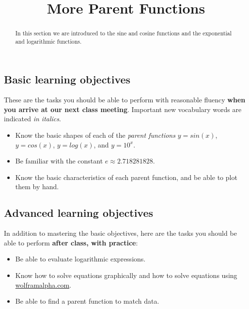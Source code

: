 \documentclass{ximera}
\title{More Parent Functions}
\begin{document}
\begin{abstract}
In this section we are introduced to the sine and cosine functions and the exponential and logarithmic functions.
\end{abstract}
\maketitle

\subsection*{Basic learning objectives}

These are the tasks you should be able to perform with reasonable fluency \textbf{when you arrive at our next class meeting}. Important new vocabulary words are indicated \emph{in italics}. 

\begin{itemize}
	\item Know the basic shapes of each of the \emph{parent functions} $y=sin(x)$, $y=cos(x)$, $y=log(x)$, and  $y=10^x$.
	\item Be familiar with the constant $e\approx 2.718281828$.
	\item Know the basic characteristics of each parent function, and be able to plot them by hand.
\end{itemize}

\subsection*{Advanced learning objectives}

In addition to mastering the basic objectives, here are the tasks you should be able to perform \textbf{after class, with practice}: 

\begin{itemize}
	\item Be able to evaluate logarithmic expressions.
	\item Know how to solve equations graphically and how to solve equations using \url{wolframalpha.com}.
	\item Be able to find a parent function to match data.
\end{itemize}
\end{document}
